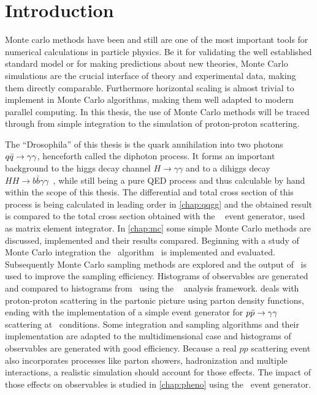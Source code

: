 \chapter{Introduction}%
\label{chap:intro}

Monte carlo methods have been and still are one of the most important
tools for numerical calculations in particle physics. Be it for
validating the well established standard model or for making
predictions about new theories, Monte Carlo simulations are the
crucial interface of theory and experimental data, making them
directly comparable. Furthermore horizontal scaling is almost trivial
to implement in Monte Carlo algorithms, making them well adapted to
modern parallel computing. In this thesis, the use of Monte Carlo
methods will be traced through from simple integration to the
simulation of proton-proton scattering.

The ``Drosophila'' of this thesis is the quark annihilation into two
photons \(q\bar{q}\rightarrow\gamma\gamma\), henceforth called the diphoton process. It forms an
important background to the higgs decay channel
\(H\rightarrow \gamma\gamma\) and to a dihiggs decay
\(HH\rightarrow b\bar{b}\gamma\gamma\)~\cite{aaboud2018:sf}, while
still being a pure QED process and thus calculable by hand within the
scope of this thesis. The differential and total cross section of this
process is being calculated in leading order in \cref{chap:qqgg} and
the obtained result is compared to the total cross section obtained
with the \sherpa~\cite{Gleisberg:2008ta} event generator, used as
matrix element integrator. In \cref{chap:mc} some simple Monte Carlo
methods are discussed, implemented and their results
compared. Beginning with a study of Monte Carlo integration the
\vegas\ algorithm~\cite{Lepage:19781an} is implemented and
evaluated. Subsequently Monte Carlo sampling methods are explored and
the output of \vegas\ is used to improve the sampling
efficiency. Histograms of observables are generated and compared to
histograms from \sherpa\ using the \rivet~\cite{Bierlich:2019rhm}
analysis framework.  deals with proton-proton
scattering in the partonic picture using parton density functions,
ending with the implementation of a simple event generator for
\(p\bar{p}\rightarrow\gamma\gamma\) scattering at \lhc\ conditions. Some integration and
sampling algorithms and their implementation are adapted to the
multidimensional case and histograms of observables are generated with
good efficiency.  Because a real \(pp\) scattering event also
incorporates processes like parton showers, hadronization and multiple
interactions, a realistic simulation should account for those
effects. The impact of those effects on observables is studied in
\cref{chap:pheno} using the \sherpa\ event generator.

